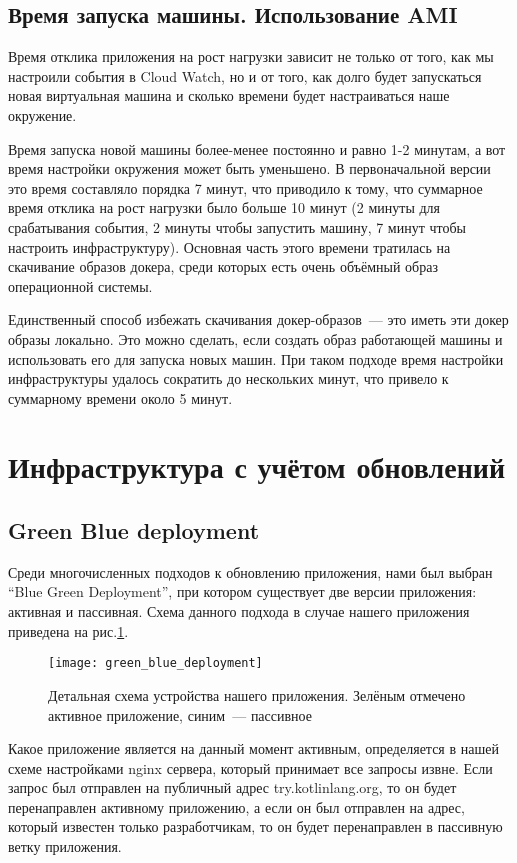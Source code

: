 \subsection{Время запуска машины. Использование AMI}
	Время отклика приложения на рост нагрузки зависит не только от того, как мы настроили события в Cloud Watch, но и от того, как долго будет запускаться новая виртуальная машина и сколько времени будет настраиваться наше окружение. 
	
	Время запуска новой машины более-менее постоянно и равно 1-2 минутам, а вот время настройки окружения может быть уменьшено. В первоначальной версии это время составляло порядка 7 минут, что приводило к тому, что суммарное время отклика на рост нагрузки было больше 10 минут (2 минуты для срабатывания события, 2 минуты чтобы запустить машину, 7 минут чтобы настроить инфраструктуру). Основная часть этого времени тратилась на скачивание образов докера, среди которых есть очень объёмный образ операционной системы.
	
	Единственный способ избежать скачивания докер-образов~--- это иметь эти докер образы локально. Это можно сделать, если создать образ работающей машины и использовать его для запуска новых машин. При таком подходе время настройки инфраструктуры удалось сократить до нескольких минут, что привело к суммарному времени около 5 минут. 
\section{Инфраструктура с учётом обновлений}
\subsection{Green Blue deployment}
	Среди многочисленных подходов к обновлению приложения, нами был выбран ``Blue Green Deployment'', при котором существует две версии приложения: активная и пассивная. Схема данного подхода в случае нашего приложения приведена на рис.\ref{fig:green_blue_deployment}.
\begin{figure}[ht]
    \centering
    \texttt{[image: green\_blue\_deployment]} 
    \caption{Детальная схема устройства нашего приложения. Зелёным отмечено активное приложение, синим~--- пассивное}
    \label{fig:green_blue_deployment}
\end{figure}

	Какое приложение является на данный момент активным, определяется в нашей схеме настройками nginx сервера, который принимает все запросы извне. Если запрос был отправлен на публичный адрес try.kotlinlang.org, то он будет перенаправлен активному приложению, а если он был отправлен на адрес, который известен только разработчикам, то он будет перенаправлен в пассивную ветку приложения.
	
